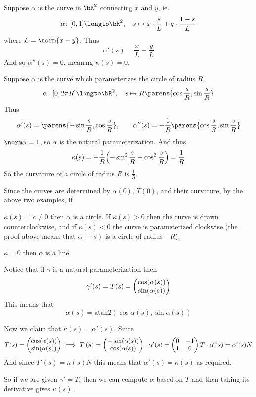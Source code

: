 \begin{exam*}

    Suppose $\alpha$ is the curve in $\bR^2$ connecting $x$ and $y$, ie.
    \[ \alpha\colon[0,1]\longto\bR^2,\quad s\mapsto x\cdot\frac sL+y\cdot\frac{1-s}L \]
    where $L=\norm{x-y}$.
    Thus
    \[ \alpha'(s) = \frac xL - \frac yL \]
    And so $\alpha''(s)=0$, meaning $\kappa(s)=0$.

\end{exam*}

\begin{exam*}

    Suppose $\alpha$ is the curve which parameterizes the circle of radius $R$,
    \[ \alpha\colon[0,2\pi R]\longto\bR^2,\quad s\mapsto R\parens{\cos\frac sR, \sin\frac sR} \]
    Thus
    \[ \alpha'(s) = \parens{-\sin\frac sR, \cos\frac sR},\qquad \alpha''(s) = -\frac1R\parens{\cos\frac sR,\sin\frac sR} \]
    $\norm\alpha=1$, so $\alpha$ is the natural parameterization.
    And thus
    \[ \kappa(s) = -\frac1R\Bigl(-\sin^2\frac sR + \cos^2\frac sR\Bigr) = \frac1R \]
    So the curvature of a circle of radius $R$ is $\frac1R$.

\end{exam*}

Since the curves are determined by $\alpha(0)$, $T(0)$, and their curvature, by the above two examples, if
\benum
    \item $\kappa(s)=c\neq0$ then $\alpha$ is a circle.
    If $\kappa(s)>0$ then the curve is drawn counterclockwise, and if $\kappa(s)<0$ the curve is parameterized clockwise (the proof above means that $\alpha(-s)$ is a circle of radius $-R$).
    \item $\kappa=0$ then $\alpha$ is a line.
\eenum

Notice that if $\gamma$ is a natural parameterization then
\[ \gamma'(s) = T(s) = \begin{pmatrix}\cos(\alpha(s)) \\ \sin(\alpha(s))\end{pmatrix} \]
This means that
\[ \alpha(s) = \mathrm{atan2}(\cos\alpha(s),\sin\alpha(s)) \]

Now we claim that $\kappa(s)=\alpha'(s)$.
Since
\[ T(s) = \begin{pmatrix}\cos(\alpha(s)) \\ \sin(\alpha(s))\end{pmatrix} \implies T'(s) = \begin{pmatrix}-\sin(\alpha(s)) \\ \cos(\alpha(s))\end{pmatrix}\cdot\alpha'(s) = \begin{pmatrix}0 & -1 \\ 1 & 0\end{pmatrix}T\cdot\alpha'(s) = \alpha'(s)N \]
And since $T'(s)=\kappa(s)N$ this means that $\alpha'(s)=\kappa(s)$ as required.

So if we are given $\gamma'=T$, then we can compute $\alpha$ based on $T$ and then taking its derivative gives $\kappa(s)$.

